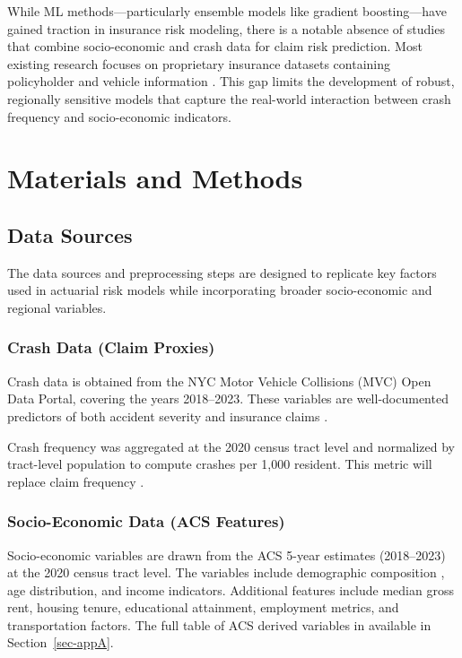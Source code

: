 \documentclass[
  number,
  review,
  3p]{elsarticle}
\begin{document}
While ML methods---particularly ensemble models like gradient
boosting---have gained traction in insurance risk modeling, there is a
notable absence of studies that combine socio-economic and crash data
for claim risk prediction. Most existing research focuses on proprietary
insurance datasets containing policyholder and vehicle information
\citep{clemente, henckaerts, jonkheijm}. This gap limits the development
of robust, regionally sensitive models that capture the real-world
interaction between crash frequency and socio-economic indicators.

\section{Materials and Methods}\label{sec-methods}

\subsection{\texorpdfstring{\textbf{Data
Sources}}{Data Sources}}\label{data-sources}

The data sources and preprocessing steps are designed to replicate key
factors used in actuarial risk models while incorporating broader
socio-economic and regional variables.

\subsubsection{\texorpdfstring{\textbf{Crash Data (Claim
Proxies)}}{Crash Data (Claim Proxies)}}\label{crash-data-claim-proxies}

Crash data is obtained from the NYC Motor Vehicle Collisions (MVC) Open
Data Portal, covering the years 2018--2023. These variables are
well-documented predictors of both accident severity and insurance
claims \citep{adeniyi, dong}.

Crash frequency was aggregated at the 2020 census tract level and
normalized by tract-level population to compute crashes per 1,000
resident. This metric will replace claim frequency \citep{brubacher}.

\subsubsection{\texorpdfstring{\textbf{Socio-Economic Data (ACS
Features)}}{Socio-Economic Data (ACS Features)}}\label{socio-economic-data-acs-features}

Socio-economic variables are drawn from the ACS 5-year estimates
(2018--2023) at the 2020 census tract level. The variables include
demographic composition , age distribution, and income indicators.
Additional features include median gross rent, housing tenure,
educational attainment, employment metrics, and transportation factors.
The full table of ACS derived variables in available in
Section~\ref{sec-appA}.
\end{document}
